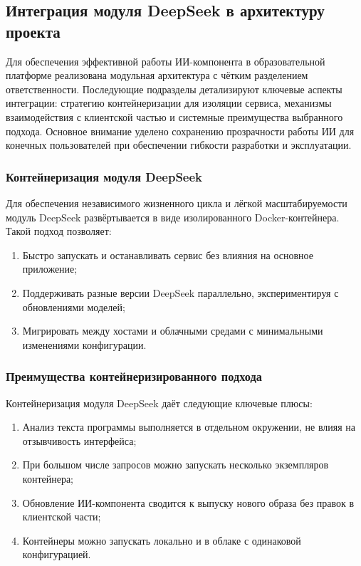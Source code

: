 \subsection{Интеграция модуля DeepSeek в архитектуру проекта}

Для обеспечения эффективной работы ИИ-компонента в образовательной платформе реализована модульная архитектура с чётким разделением ответственности. Последующие подразделы детализируют ключевые аспекты интеграции: стратегию контейнеризации для изоляции сервиса, механизмы взаимодействия с клиентской частью и системные преимущества выбранного подхода. Основное внимание уделено сохранению прозрачности работы ИИ для конечных пользователей при обеспечении гибкости разработки и эксплуатации.

\subsubsection{Контейнеризация модуля DeepSeek}
Для обеспечения независимого жизненного цикла и лёгкой масштабируемости модуль DeepSeek развёртывается в виде изолированного Docker-контейнера. Такой подход позволяет:

\begin{enumerate}
  \item Быстро запускать и останавливать сервис без влияния на основное приложение;
  \item Поддерживать разные версии DeepSeek параллельно, экспериментируя с обновлениями моделей;
  \item Мигрировать между хостами и облачными средами с минимальными изменениями конфигурации.
\end{enumerate}

\subsubsection{Преимущества контейнеризированного подхода}
Контейнеризация модуля DeepSeek даёт следующие ключевые плюсы:
\begin{enumerate}
  \item Анализ текста программы выполняется в отдельном окружении, не влияя на отзывчивость интерфейса;
  \item При большом числе запросов можно запускать несколько экземпляров контейнера;
  \item Обновление ИИ-компонента сводится к выпуску нового образа без правок в клиентской части;
  \item Контейнеры можно запускать локально и в облаке с одинаковой конфигурацией.
\end{enumerate}

